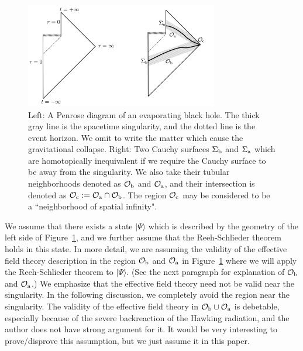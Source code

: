 \documentclass[a4paper,11pt]{article}
\theoremstyle{plain}
\theoremstyle{definition}
\numberwithin{thm}{section}
\newcommand{\ket}[1]{ | {#1} \rangle }
\def\CO{{\cal O}}
\begin{document}
\begin{figure}
\centering
\includegraphics[width=0.75\textwidth]{evaporate}
\caption{Left: A Penrose diagram of an evaporating black hole. The thick gray line is the spacetime singularity, and the dotted line is the event horizon.
We omit to write the matter which cause the gravitational collapse.
Right: Two Cauchy surfaces $\Sigma_{\rm b}$ and $\Sigma_{\rm a}$ which are homotopically inequivalent if we require the Cauchy surface to be away from the singularity. 
We also take their tubular neighborhoods denoted as $\CO_{\rm b}$ and $\CO_{\rm a}$, and their intersection is denoted as $\CO_{\rm c}:=\CO_{\rm a} \cap \CO_{\rm b} $.
The region $\CO_{\rm c}$ may be considered to be a ``neighborhood of spatial infinity".
 \label{fig:evaporate}}
\end{figure}

We assume that there exists a state $\ket{\Psi}$ which is described by the geometry of the left side of Figure~\ref{fig:evaporate},
and we further assume that the Reeh-Schlieder theorem holds in this state.
In more detail, we are assuming the validity of the effective field theory description in the region $\CO_{\rm b}$ and $\CO_{\rm a}$ in Figure~\ref{fig:evaporate} 
where we will apply the Reeh-Schlieder theorem to $\ket{\Psi}$. (See the next paragraph for explanation of $\CO_{\rm b}$ and $\CO_{\rm a}$.)
We emphasize that the effective field theory need not be valid near the singularity. In the following discussion,
we completely avoid the region near the singularity.
The validity of the effective field theory in $\CO_{\rm b} \cup \CO_{\rm a}$ is debetable,
especially because of the severe backreaction of the Hawking radiation, and
the author does not have strong argument for it. It would be very interesting
to prove/disprove this assumption,
but we just assume it in this paper. 
\end{document}
